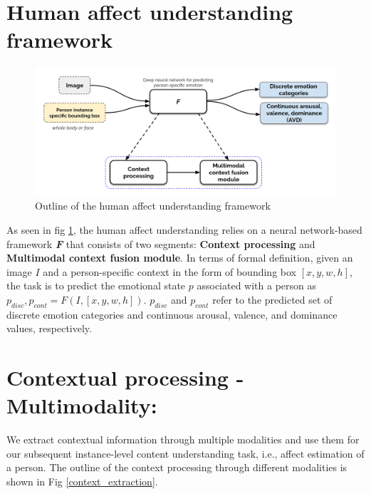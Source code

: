 \section{Human affect understanding framework}

\begin{figure}[h!]
    \centering
    \includegraphics[width=\textwidth]{figures/human_affect_understanding.png}
    \caption{Outline of the human affect understanding framework }
    \label{human affect understanding}
\end{figure}

As seen in fig \ref{human affect understanding}, the human affect understanding relies on a neural network-based framework \textbf{\textit{F}} that consists of two segments: \textbf{Context processing} and \textbf{Multimodal context fusion module}. In terms of formal definition, given an image $I$ and a person-specific context in the form of bounding box $[x,y,w,h]$, the task is to predict the emotional state $p$ associated with a person as $p_{disc}, p_{cont} = F(I,[x,y,w,h])$. $p_{disc}$ and $p_{cont}$ refer to the predicted set of discrete emotion categories and continuous arousal, valence, and dominance values, respectively.

\section{Contextual processing - Multimodality:}

We extract contextual information through multiple modalities and use them for our subsequent instance-level content understanding task, i.e., affect estimation of a person. The outline of the context processing through different modalities is shown in Fig \ref{context_extraction}.


